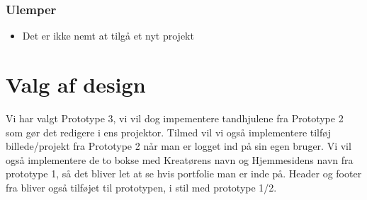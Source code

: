 \documentclass[a4paper,titlepage,fleqn,12pt]{article}
\begin{document}
\subsubsection{Ulemper}
\begin{itemize}
	\item Det er ikke nemt at tilgå et nyt projekt
\end{itemize}

\section{Valg af design}

Vi har valgt Prototype 3, vi vil dog impementere tandhjulene fra Prototype 2 som gør det redigere i ens projektor. Tilmed vil vi også implementere tilføj billede/projekt fra Prototype 2 når man er logget ind på sin egen bruger. Vi vil også implementere de to bokse med Kreatørens navn og Hjemmesidens navn fra prototype 1, så det bliver let at se hvis portfolie man er inde på. Header og footer fra bliver også tilføjet til prototypen, i stil med prototype 1/2.
\end{document}
